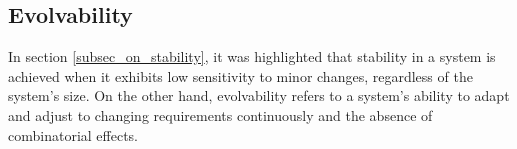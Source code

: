 \subsection{Evolvability} \label{sec_on_evolvability}

In section \ref{subsec_on_stability}, it was highlighted that stability in a system is
achieved when it exhibits low sensitivity to minor changes, regardless of the system's
size. On the other hand, evolvability refers to a system's ability to adapt and adjust to
changing requirements continuously and the absence of combinatorial effects.